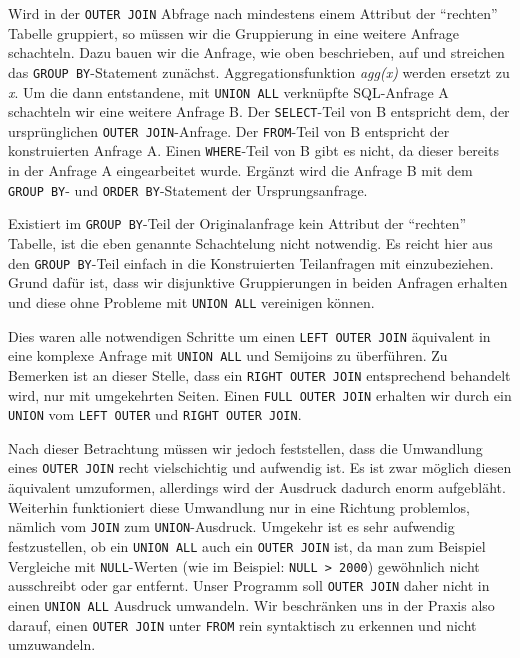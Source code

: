 Wird in der \verb|OUTER JOIN| Abfrage nach mindestens einem Attribut der ``rechten'' Tabelle gruppiert, so müssen wir die Gruppierung in eine weitere Anfrage schachteln. Dazu bauen wir die Anfrage, wie oben beschrieben, auf und streichen das \verb|GROUP BY|-Statement zunächst. Aggregationsfunktion \textit{agg(x)} werden ersetzt zu \textit{x}. Um die dann entstandene, mit \verb|UNION ALL| verknüpfte SQL-Anfrage A schachteln wir eine weitere Anfrage B. Der \verb|SELECT|-Teil von B entspricht dem, der ursprünglichen \verb|OUTER JOIN|-Anfrage. Der \verb|FROM|-Teil von B entspricht der konstruierten Anfrage A. Einen \verb|WHERE|-Teil von B gibt es nicht, da dieser bereits in der Anfrage A eingearbeitet wurde. Ergänzt wird die Anfrage B mit dem \verb|GROUP BY|- und \verb|ORDER BY|-Statement der Ursprungsanfrage.

Existiert im \verb|GROUP BY|-Teil der Originalanfrage kein Attribut der ``rechten'' Tabelle, ist die eben genannte Schachtelung nicht notwendig. Es reicht hier aus den \verb|GROUP BY|-Teil einfach in die Konstruierten Teilanfragen mit einzubeziehen. Grund dafür ist, dass wir disjunktive Gruppierungen in beiden Anfragen erhalten und diese ohne Probleme mit \verb|UNION ALL| vereinigen können.

Dies waren alle notwendigen Schritte um einen \verb|LEFT OUTER JOIN| äquivalent in eine komplexe Anfrage mit \verb|UNION ALL| und Semijoins zu überführen. Zu Bemerken ist an dieser Stelle, dass ein \verb|RIGHT OUTER JOIN| entsprechend behandelt wird, nur mit umgekehrten Seiten. Einen \verb|FULL OUTER JOIN| erhalten wir durch ein \verb|UNION| vom \verb|LEFT OUTER| und \verb|RIGHT OUTER JOIN|. 

Nach dieser Betrachtung müssen wir jedoch feststellen, dass die Umwandlung eines \verb|OUTER JOIN| recht vielschichtig und aufwendig ist. Es ist zwar möglich diesen äquivalent umzuformen, allerdings wird der Ausdruck dadurch enorm aufgebläht. Weiterhin funktioniert diese Umwandlung nur in eine Richtung problemlos, nämlich vom \verb|JOIN| zum \verb|UNION|-Ausdruck. Umgekehr ist es sehr aufwendig festzustellen, ob ein \verb|UNION ALL| auch ein \verb|OUTER JOIN| ist, da man zum Beispiel Vergleiche mit \verb|NULL|-Werten (wie im Beispiel: \verb|NULL > 2000|) gewöhnlich nicht ausschreibt oder gar entfernt. Unser Programm soll \verb|OUTER JOIN| daher nicht in einen \verb|UNION ALL| Ausdruck umwandeln. Wir beschränken uns in der Praxis also darauf, einen \verb|OUTER JOIN| unter \verb|FROM| rein syntaktisch zu erkennen und nicht umzuwandeln.

